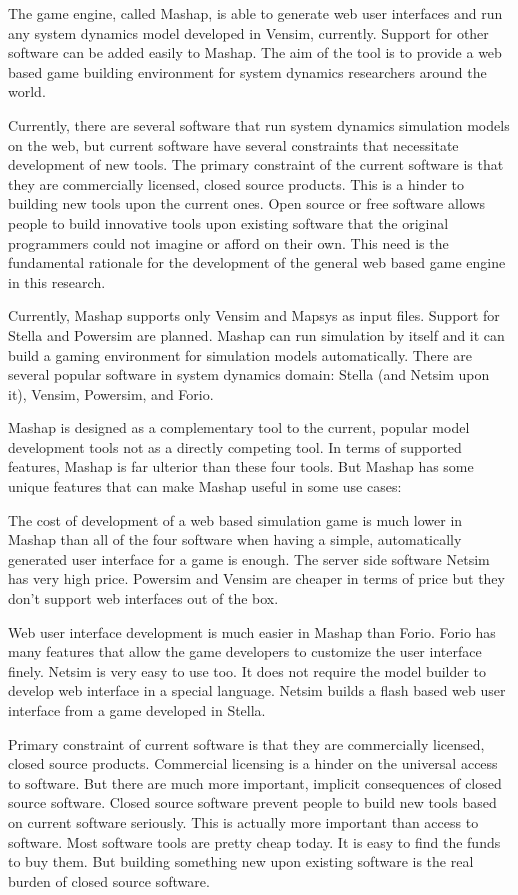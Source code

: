 \documentclass[12pt,a4paper]{paper}
\begin{document}
The game engine, called Mashap, is able to generate web user interfaces and run any system dynamics model developed in Vensim, currently. Support for other software can be added easily to Mashap. The aim of the tool is to provide a web based game building environment for system dynamics researchers around the world.

Currently, there are several software that run system dynamics simulation models on the web, but current software have several constraints that necessitate development of new tools. The primary constraint of the current software is that they are commercially licensed, closed source products. This is a hinder to building new tools upon the current ones. Open source or free software allows people to build innovative tools upon existing software that the original programmers could not imagine or afford on their own. This need is the fundamental rationale for the development of the general web based game engine in this research.

Currently, Mashap supports only Vensim and Mapsys as input files. Support for Stella and Powersim are planned. Mashap can run simulation by itself and it can build a gaming environment for simulation models automatically. There are several popular software in system dynamics domain: Stella (and Netsim upon it), Vensim, Powersim, and Forio.

Mashap is designed as a complementary tool to the current, popular model development tools not as a directly competing tool. In terms of supported features, Mashap is far ulterior than these four tools. But Mashap has some unique features that can make Mashap useful in some use cases:

The cost of development of a web based simulation game is much lower in Mashap than all of the four software when having a simple, automatically generated user interface for a game is enough. The server side software Netsim has very high price. Powersim and Vensim are cheaper in terms of price but they don't support web interfaces out of the box. 

Web user interface development is much easier in Mashap than Forio. Forio has many features that allow the game developers to customize the user interface finely. Netsim is very easy to use too. It does not require the model builder to develop web interface in a special language. Netsim builds a flash based web user interface from a game developed in Stella.

Primary constraint of current software is that they are commercially licensed, closed source products. Commercial licensing is a hinder on the universal access to software. But there are much more important, implicit consequences of closed source software. Closed source software prevent people to build new tools based on current software seriously. This is actually more important than access to software. Most software tools are pretty cheap today. It is easy to find the funds to buy them. But building something new upon existing software is the real burden of closed source software.
\end{document}

